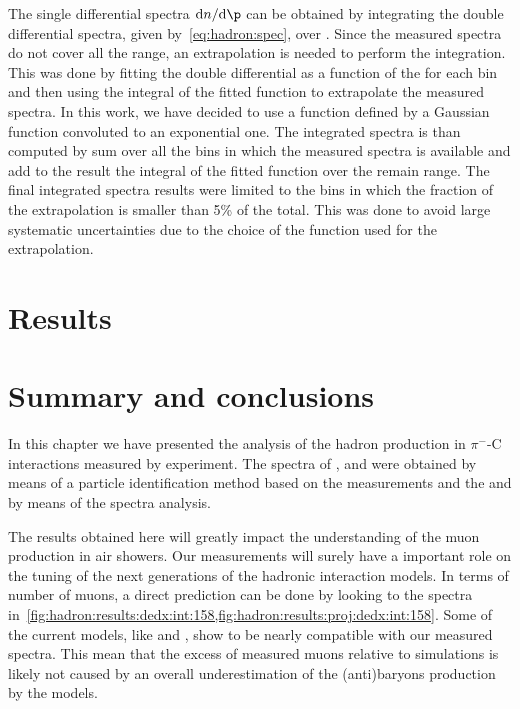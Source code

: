 The single differential spectra $\text{d}n/\text{d}\p$ can be obtained
by integrating the double differential spectra,
given by~\cref{eq:hadron:spec}, over \pT. Since the measured
spectra do not cover all the \pT range, an extrapolation is needed
to perform the integration. This was done by fitting
the double differential as a function of the \pT for each \pp bin
and then using the integral of the fitted function to
extrapolate the measured spectra.  
In this work, we have decided to use a function
defined by a Gaussian function convoluted to
an exponential one. 
The \pT integrated spectra is than computed by sum over
all the \pT bins in which the measured spectra is available
and add to the result the integral of the fitted function
over the remain \pT range. The final \pT integrated spectra results
were limited to the \pp bins in which the fraction of the extrapolation
is smaller than 5\% of the total. This was done to avoid large systematic
uncertainties due to the choice of the function used for the extrapolation.


\section{Results}
\label{sec:hadron:results}



\section{Summary and conclusions}


In this chapter we have presented the
analysis of the hadron production in $\pi^-$-C interactions
measured by \NASixtyOne experiment. 
The spectra of \pions, \kaons and \protons were obtained by
means of a particle identification method based on the
\dedx measurements and the \lambs and \kzeros by means
of the \minv spectra analysis.





The results obtained here will greatly impact the understanding
of the muon production in air showers.
Our measurements will surely have a important role
on the tuning of the next generations of the hadronic
interaction models. In terms of number of muons,
a direct prediction can be done by looking
to the \antiproton spectra
in~\cref{fig:hadron:results:dedx:int:158,fig:hadron:results:proj:dedx:int:158}.
Some of the current models, like \EposLong and \SibyllNewLong, 
show to be nearly compatible with our measured spectra.
This mean that the excess of measured muons 
relative to simulations is likely not caused
by an overall underestimation of the (anti)baryons
production by the models.  




